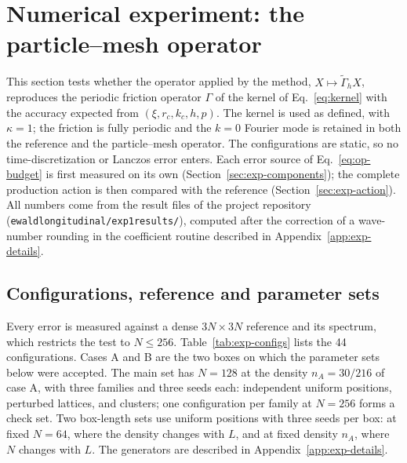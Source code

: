 \documentclass[11pt]{article}
\theoremstyle{plain}
\DeclareRobustCommand{\_}{\textunderscore\allowbreak}
\begin{document}
\section{Numerical experiment: the particle--mesh operator}
\label{sec:experiments}

This section tests whether the operator applied by the method,
$X\mapsto\widetilde\Gamma_hX$, reproduces the periodic friction operator
$\Gamma$ of the kernel of Eq.~\eqref{eq:kernel} with the accuracy expected
from $(\xi,r_c,k_c,h,p)$. The kernel is used as defined, with $\kappa=1$; the
friction is fully periodic and the $k=0$ Fourier mode is retained in both the
reference and the particle--mesh operator. The configurations are static, so
no time-discretization or Lanczos error enters. Each error source of
Eq.~\eqref{eq:op-budget} is first measured on its own
(Section~\ref{sec:exp-components}); the complete production action is then
compared with the reference (Section~\ref{sec:exp-action}). All numbers come
from the result files of the project repository
(\texttt{ewald\_longitudinal/exp1\_results/}), computed after the correction of
a wave-number rounding in the coefficient routine described in
Appendix~\ref{app:exp-details}.

\subsection{Configurations, reference and parameter sets}
\label{sec:pm-validation}

Every error is measured against a dense $3N\times3N$ reference and its
spectrum, which restricts the test to $N\le256$. Table~\ref{tab:exp-configs}
lists the 44 configurations. Cases A and B are the two boxes on which the
parameter sets below were accepted. The main set has $N=128$ at the density
$n_A=30/216$ of case A, with three families and three seeds each: independent
uniform positions, perturbed lattices, and clusters; one configuration per
family at $N=256$ forms a check set. Two box-length sets use uniform
positions with three seeds per box: at fixed $N=64$, where the density changes
with $L$, and at fixed density $n_A$, where $N$ changes with $L$. The
generators are described in Appendix~\ref{app:exp-details}.
\end{document}
